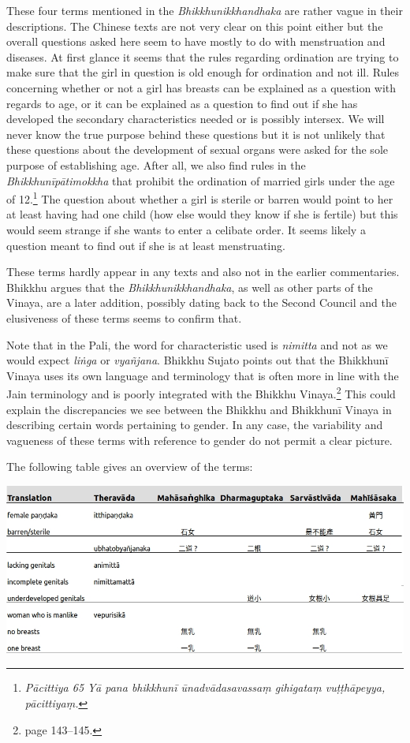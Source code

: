 These four terms mentioned in the {\em Bhikkhunikkhandhaka} are rather vague in their descriptions. The Chinese texts are not very clear on this point either but the overall questions asked here seem to have mostly to do with menstruation and diseases. At first glance it seems that the rules regarding ordination are trying to make sure that the girl in question is old enough for ordination and not ill. Rules concerning whether or not a girl has breasts can be explained as a question with regards to age, or it can be explained as a question to find out if she has developed the secondary characteristics needed or is possibly intersex. We will never know the true purpose behind these questions but it is not unlikely that these questions about the development of sexual organs were asked for the sole purpose of establishing age. After all, we also find rules in the {\em Bhikkhunīpātimokkha} that prohibit the ordination of married girls under the age of 12.\footnote{{\em Pācittiya 65 Yā pana bhikkhunī ūnad­vāda­sa­vassaṃ gihigataṃ vuṭṭhāpeyya, pācittiyaṃ.}} The question about whether a girl is sterile or barren would point to her at least having had one child (how else would they know if she is fertile) but this would seem strange if she wants to enter a celibate order. It seems likely a question meant to find out if she is at least menstruating. 

These terms hardly appear in any texts and also not in the earlier commentaries. Bhikkhu \cite{sujato2009} argues that the {\em Bhikkhunikkhandhaka}, as well as other parts of the Vinaya, are a later addition, possibly dating back to the Second Council and the elusiveness of these terms seems to confirm that.

Note that in the Pali, the word for characteristic used is {\em nimitta} and not as we would expect {\em liṅga} or {\em vyañ­jana}. Bhikkhu Sujato points out that the Bhikkhunī Vinaya uses its own language and terminology that is often more in line with the Jain terminology and is poorly integrated with the Bhikkhu Vinaya.\footnote{\cite{sujato2009} page 143–145.} This could explain the discrepancies we see between the Bhikkhu and Bhikkhunī Vinaya in describing certain words pertaining to gender. In any case, the variability and vagueness of these terms with reference to gender do not permit a clear picture. 

The following table gives an overview of the terms:

\bigskip
\includegraphics[width=\linewidth]{female.jpg}
\label{female}

